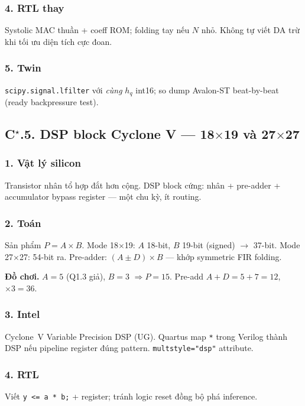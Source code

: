 \subsubsection*{4. RTL thay}
Systolic MAC thuần + coeff ROM; folding tay nếu $N$ nhỏ. Không tự viết DA trừ khi tối ưu diện tích cực đoan.

\subsubsection*{5. Twin}
\texttt{scipy.signal.lfilter} với \emph{cùng} $h_q$ int16; so dump Avalon-ST beat-by-beat (ready backpressure test).

\subsection*{C$^\star$.5. DSP block Cyclone V --- 18$\times$19 và 27$\times$27}

\subsubsection*{1. Vật lý silicon}
Transistor nhân tổ hợp đắt hơn cộng. DSP block cứng: nhân + pre-adder + accumulator bypass register --- một chu kỳ, ít routing.

\subsubsection*{2. Toán}
Sản phẩm $P=A\times B$. Mode 18$\times$19: $A$ 18-bit, $B$ 19-bit (signed) $\to$ 37-bit. Mode 27$\times$27: 54-bit ra. Pre-adder: $(A\pm D)\times B$ --- khớp symmetric FIR folding.

\noindent\textbf{Đồ chơi.} $A=5$ (Q1.3 giả), $B=3$ $\Rightarrow P=15$. Pre-add $A+D=5+7=12$, $\times3=36$.

\subsubsection*{3. Intel}
Cyclone~V Variable Precision DSP (UG). Quartus map \texttt{*} trong Verilog thành DSP nếu pipeline register đúng pattern. \texttt{multstyle="dsp"} attribute.

\subsubsection*{4. RTL} Viết \texttt{y <= a * b;} + register; tránh logic reset đồng bộ phá inference.

